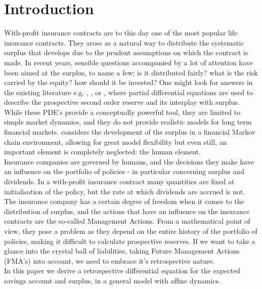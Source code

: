 \documentclass[12pt]{article}
\begin{document}
\section*{Introduction}
With-profit insurance contracts are to this day one of the most popular life insurance contracts. They arose as a natural way to distribute the systematic surplus that develops due to the prudent assumptions on which the contract is made. In recent years, sensible questions accompanied by a lot of attention have been aimed at the surplus, to name a few; is it distributed fairly? what is the risk carried by the equity? how should it be invested? One might look for answers in the existing literature e.g. \citet{Liv2}, \citet{NorbergB}, \citet{Steffensen0} or \citet{Steffensen1}, where partial differential equations are used to describe the prospective second order reserve and its interplay with surplus. While these PDE's provide a conceptually powerful tool, they are limited to simple market dynamics, and they do not provide realistic models for long term financial markets. \citet{NorbergB} considers the development of the surplus in a financial Markov chain environment, allowing for great model flexibility but even still, an important element is completely neglected: the human element.
\\[12pt]
Insurance companies are governed by humans, and the decisions they make have an influence on the portfolio of policies - in particular concerning surplus and dividends. In a with-profit insurance contract many quantities are fixed at initialisation of the policy, but the rate at which dividends are accrued is not. The insurance company has a certain degree of freedom when it comes to the distribution of surplus, and the actions that have an influence on the insurance contracts are the so-called Management Actions.
From a mathematical point of view, they pose a problem as they depend on the entire history of the portfolio of policies, making it difficult to calculate prospective reserves. If we want to take a glance into the crystal ball of liabilities, taking Future Management Actions (FMA's) into account, we need to embrace it's retrospective nature.
\\[12pt]
In this paper we derive a retrospective differential equation for the expected savings account and surplus, in a general model with affine dynamics.  
\end{document}
